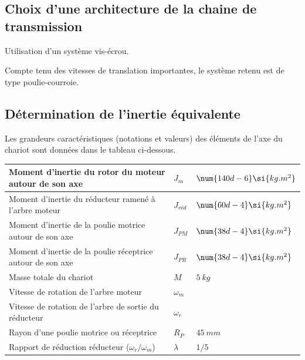 \subsection*{Choix d'une architecture de la chaine de transmission}

\ifprof
\begin{corrige}
Utilisation d’un système vis-écrou.
\end{corrige}
\else
\fi

\ifprof
\else
Compte tenu des vitesses de translation importantes, le système retenu est de type poulie-courroie.
\fi

\subsection*{Détermination de l'inertie équivalente} 
\ifprof
\else

Les grandeurs caractéristiques (notations et valeurs) des éléments de l'axe du chariot sont données dans le tableau ci-dessous.
\begin{center}
\begin{tabular}{p{8cm}ll}
\hline
Moment d'inertie du rotor du moteur autour de son axe&	$J_m$ & $\num{140d-6}\si{kg.m^2}$ \\ \hline
Moment d'inertie du réducteur ramené à l'arbre moteur&	$J_{réd}$ & $\num{60d-4}\si{kg.m^2}$ \\ \hline
Moment d'inertie de la poulie motrice autour de son axe&	$J_{PM}$	&$ \num{38d-4}\si{kg.m^2}$ \\ \hline
Moment d'inertie de la poulie réceptrice autour de son axe&	$J_{PR}$ & $\num{38d-4}\si{kg.m^2}$ \\ \hline
Masse totale du chariot	&$M$ &$\SI{5}{kg}$ \\ \hline
Vitesse de rotation de l'arbre moteur &$\omega_m$ &  \\ \hline
Vitesse de rotation de l'arbre de sortie du réducteur	&$\omega_r$&  \\ \hline
Rayon d'une poulie motrice ou réceptrice	& $R_P$ &$\SI{45}{mm}$ \\ \hline
Rapport de réduction réducteur ($\omega_r/\omega_m$)	& $\lambda$	&$1/5$ \\ \hline
\end{tabular}
\end{center}
\fi

